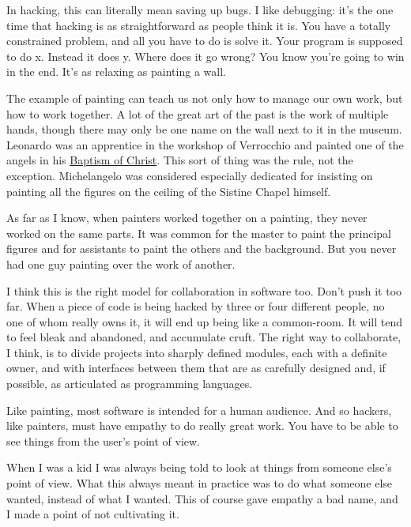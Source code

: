 In hacking, this can literally mean saving up bugs.
I like debugging: it's the
one time that hacking is as straightforward as   
people think it is.  You have a
totally constrained problem, and all you have to do is solve
it.  Your program is supposed to do x.  Instead it does y.
Where does it go wrong? You know you're going to win
in the end.  It's as relaxing as painting a wall.



The example of painting can teach us not only how to manage our
own work, but how to work together.  A lot of the
great art of the past is the work of multiple hands, though
there may only be one name on the wall next to it in the
museum.  Leonardo was an apprentice in the workshop of
Verrocchio and painted one of the angels in his \href{http://www.paulgraham.com/baptism.html}{Baptism of
Christ}.  This sort of thing was the rule, not the exception.
Michelangelo was considered especially dedicated for insisting
on painting all the figures on the ceiling of the Sistine
Chapel himself.

As far as I know, when painters worked together on a painting,
they never worked on the same parts.  It was common
for the master to paint the principal figures and for assistants
to paint the others and the background.  But you never had
one guy painting over the work of another.

I think this is the right model for collaboration in software
too.  Don't push it too far.  When a piece of code is
being hacked by three or four different people, no one of whom
really owns it, it will end up being like a common-room.  It will
tend to feel bleak and abandoned, and accumulate cruft.
The right
way to collaborate, I think, is to divide projects into sharply
defined modules, each with a definite owner, and with interfaces
between them that are as carefully designed and, if possible,
as articulated as programming languages.



Like painting, most software is intended for
a human audience.  And so hackers, like painters, must have
empathy to do really great work.  You have to be able to see
things from the user's point of view.

When I was a kid I was always being told to look at things from
someone else's point of view.  What this always meant in
practice was to do what someone else wanted, instead of what
I wanted.  This of course gave empathy a bad name, and I made a
point of not cultivating it.

